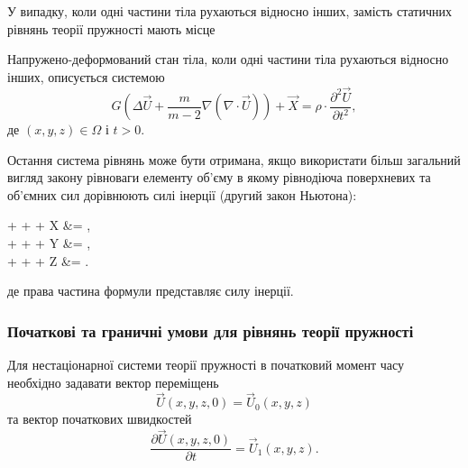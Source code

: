 У випадку, коли одні частини тіла рухаються відносно інших, замість статичних рівнянь теорії пружності мають місце 
\begin{th_equation}
	Напружено-деформований стан тіла, коли одні частини тіла рухаються відносно інших, описується системою
	\begin{equation}
		G \left( \Delta \vec U + \frac{m}{m - 2} \nabla \left(\nabla \cdot \vec U\right) \right) + \vec X = \rho \cdot \frac{\partial^2 \vec U}{\partial t^2},
	\end{equation}
	де $(x, y, z) \in \Omega$ і $ t > 0$.
\end{th_equation}

\begin{remark}
	Остання система рівнянь може бути отримана, якщо використати більш загальний вигляд закону рівноваги елементу об'єму в якому рівнодіюча поверхневих та об'ємних сил дорівнюють силі інерції (другий закон Ньютона):
	\begin{system}
		 +  +  + X &= \rho \cdot {}, \\
		 +  +  + Y &= \rho \cdot {}, \\
		 +  +  + Z &= \rho \cdot {}.
	\end{system}
	де права частина формули представляє силу інерції.
\end{remark}

\subsubsection{Початкові та граничні умови для рівнянь теорії пружності}

Для нестаціонарної системи теорії пружності в початковий момент часу необхідно задавати вектор переміщень
\begin{equation}
	\vec U(x, y, z, 0) = \vec U_0(x, y, z)
\end{equation}
та вектор початкових швидкостей
\begin{equation}
	\frac{\partial \vec U(x, y, z, 0)}{\partial t} = \vec U_1(x, y, z).
\end{equation}

